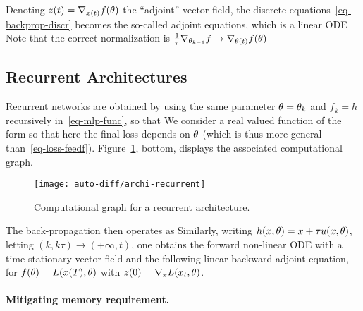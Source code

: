 Denoting $z(t) = \nabla_{x(t)} f(\theta)$ the ``adjoint'' vector field, the discrete equations~\eqref{eq-backprop-discr} becomes the so-called adjoint equations, which is a linear ODE 
Note that the correct normalization is $\frac{1}{\tau} \nabla_{\theta_{k-1}} f  \rightarrow \nabla_{\theta(t)} f(\theta)$

\subsection{Recurrent Architectures}

Recurrent networks are obtained by using the same parameter $\theta=\theta_k$ and $f_k=h$ recursively in~\eqref{eq-mlp-func}, so that 
We consider a real valued function of the form
so that here the final loss depends on $\theta$ (which is thus more general than~\eqref{eq-loss-feedf}).  Figure~\ref{fig-recur}, bottom, displays the associated computational graph.


\begin{figure}
\centering
\texttt{[image: auto-diff/archi-recurrent]}
\caption{\label{fig-recur}
Computational graph for a recurrent architecture.
}
\end{figure}

The back-propagation then operates as 
Similarly, writing $h(x,\theta) = x + \tau u(x,\theta)$, letting $(k,k\tau) \rightarrow (+\infty,t)$, one obtains the forward non-linear ODE with a time-stationary vector field
and the following linear backward adjoint equation, for $f(\theta)=L(x(T),\theta)$
with $z(0) = \nabla_x L(x_t,\theta)$. 


\paragraph{Mitigating memory requirement. }


